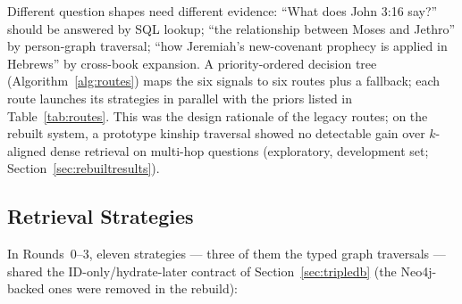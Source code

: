 Different question shapes need different evidence: ``What does John 3:16
say?'' should be answered by SQL lookup; ``the relationship between Moses
and Jethro'' by person-graph traversal; ``how Jeremiah's new-covenant
prophecy is applied in Hebrews'' by cross-book expansion. A
priority-ordered decision tree (Algorithm~\ref{alg:routes}) maps the six
signals to six routes plus a fallback; each route launches its strategies
in parallel with the priors listed in Table~\ref{tab:routes}. This was
the design rationale of the legacy routes; on the rebuilt system, a
prototype kinship traversal showed no detectable gain over $k$-aligned
dense retrieval on multi-hop questions (exploratory, development set;
Section~\ref{sec:rebuiltresults}).

\subsection{Retrieval Strategies}
\label{sec:strategies}

In Rounds~0--3, eleven strategies --- three of them the typed graph
traversals --- shared the ID-only/hydrate-later contract of
Section~\ref{sec:tripledb} (the Neo4j-backed ones were removed in the
rebuild):

